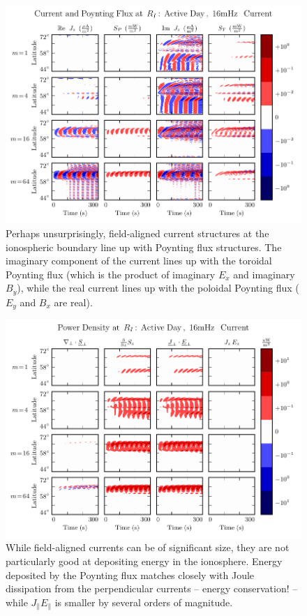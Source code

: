 \begin{figure}[!htb]
    \centering
    \includegraphics[width=\textwidth]{figures/current_poynting_flux.pdf}
    \caption[Current and Poynting Flux at the Ionosphere]{
      Perhaps unsurprisingly, field-aligned current structures at the ionospheric boundary line up with Poynting flux structures. The imaginary component of the current lines up with the toroidal Poynting flux (which is the product of imaginary $E_x$ and imaginary $B_y$), while the real current lines up with the poloidal Poynting flux ($E_y$ and $B_x$ are real). 
    }
    \label{fig_current_poynting_flux}
\end{figure}




\begin{figure}[!htb]
    \centering
    \includegraphics[width=\textwidth]{figures/power_density.pdf}
    \caption[Power Density at the Ionosphere]{
      While field-aligned currents can be of significant size, they are not particularly good at depositing energy in the ionosphere. Energy deposited by the Poynting flux matches closely with Joule dissipation from the perpendicular currents -- energy conservation! -- while $J_\parallel E_\parallel$ is smaller by several orders of magnitude. 
    }
    \label{fig_power_density}
\end{figure}



